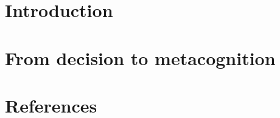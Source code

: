 \documentclass[12pt,a4paper]{book}
\date{TBD}
\begin{document}
\frontmatter


\setcounter{tocdepth}{2}
\tableofcontents
\listoffigures
\listoftables
\listoftodos

\mainmatter
\part{Introduction}


\part{From decision to metacognition}



\backmatter
\part{References}
\printglossaries
\printbibliography[heading=bibintoc]
\end{document}
